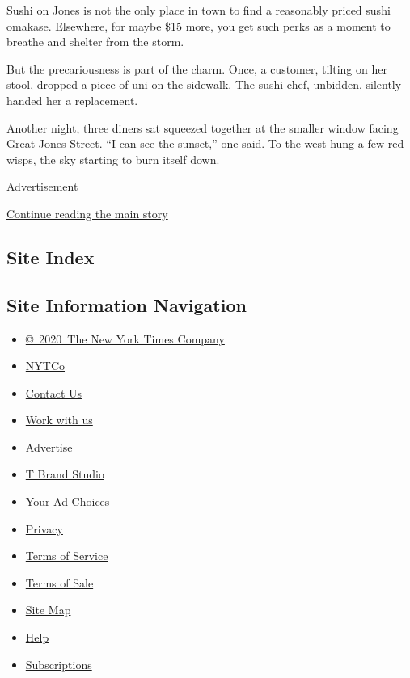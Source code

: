 Sushi on Jones is not the only place in town to find a reasonably priced
sushi omakase. Elsewhere, for maybe \$15 more, you get such perks as a
moment to breathe and shelter from the storm.

But the precariousness is part of the charm. Once, a customer, tilting
on her stool, dropped a piece of uni on the sidewalk. The sushi chef,
unbidden, silently handed her a replacement.

Another night, three diners sat squeezed together at the smaller window
facing Great Jones Street. ``I can see the sunset,'' one said. To the
west hung a few red wisps, the sky starting to burn itself down.

Advertisement

\protect\hyperlink{after-bottom}{Continue reading the main story}

\hypertarget{site-index}{%
\subsection{Site Index}\label{site-index}}

\hypertarget{site-information-navigation}{%
\subsection{Site Information
Navigation}\label{site-information-navigation}}

\begin{itemize}
\tightlist
\item
  \href{https://help.nytimes3xbfgragh.onion/hc/en-us/articles/115014792127-Copyright-notice}{©~2020~The
  New York Times Company}
\end{itemize}

\begin{itemize}
\tightlist
\item
  \href{https://www.nytco.com/}{NYTCo}
\item
  \href{https://help.nytimes3xbfgragh.onion/hc/en-us/articles/115015385887-Contact-Us}{Contact
  Us}
\item
  \href{https://www.nytco.com/careers/}{Work with us}
\item
  \href{https://nytmediakit.com/}{Advertise}
\item
  \href{http://www.tbrandstudio.com/}{T Brand Studio}
\item
  \href{https://www.nytimes3xbfgragh.onion/privacy/cookie-policy\#how-do-i-manage-trackers}{Your
  Ad Choices}
\item
  \href{https://www.nytimes3xbfgragh.onion/privacy}{Privacy}
\item
  \href{https://help.nytimes3xbfgragh.onion/hc/en-us/articles/115014893428-Terms-of-service}{Terms
  of Service}
\item
  \href{https://help.nytimes3xbfgragh.onion/hc/en-us/articles/115014893968-Terms-of-sale}{Terms
  of Sale}
\item
  \href{https://spiderbites.nytimes3xbfgragh.onion}{Site Map}
\item
  \href{https://help.nytimes3xbfgragh.onion/hc/en-us}{Help}
\item
  \href{https://www.nytimes3xbfgragh.onion/subscription?campaignId=37WXW}{Subscriptions}
\end{itemize}
